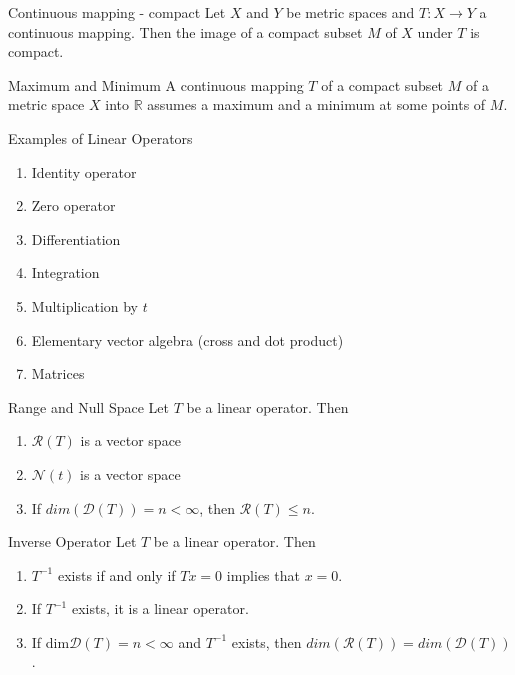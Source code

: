 \documentclass[avery5388,grid,frame]{flashcards}
\begin{document}
\begin{flashcard}[Theorem]{Continuous mapping - compact}
Let $X$ and $Y$ be metric spaces and $T\colon X\rightarrow Y$ a continuous mapping. Then the image of a compact subset $M$ of $X$ under $T$ is compact.
\end{flashcard}

\begin{flashcard}[Theorem]{Maximum and Minimum}
A continuous mapping $T$ of a compact subset $M$ of a metric space $X$ into $\mathbb{R}$ assumes a maximum and a minimum at some points of $M$.
\end{flashcard}

\begin{flashcard}[Example]{Examples of Linear Operators}
\begin{enumerate}
\item Identity operator
\item Zero operator
\item Differentiation
\item Integration
\item Multiplication by $t$
\item Elementary vector algebra (cross and dot product)
\item Matrices
\end{enumerate}
\end{flashcard}

\begin{flashcard}[Theorem]{Range and Null Space}
Let $T$ be a linear operator. Then
\begin{enumerate}
\item $\mathscr{R}(T)$ is a vector space
\item $\mathscr{N}(t)$ is a vector space
\item If $dim(\mathscr{D}(T))=n<\infty$, then $\mathscr{R}(T)\leq n$.
\end{enumerate}
\end{flashcard}

\begin{flashcard}[Theorem]{Inverse Operator}
Let $T$ be a linear operator. Then
\begin{enumerate}
\item $T^{-1}$ exists if and only if $Tx=0$ implies that $x=0$.
\item If $T^{-1}$ exists, it is a linear operator.
\item If dim$\mathscr{D}(T)=n<\infty$ and $T^{-1}$ exists, then $dim(\mathscr{R}(T))=dim(\mathscr{D}(T))$.
\end{enumerate}
\end{flashcard}
\end{document}
